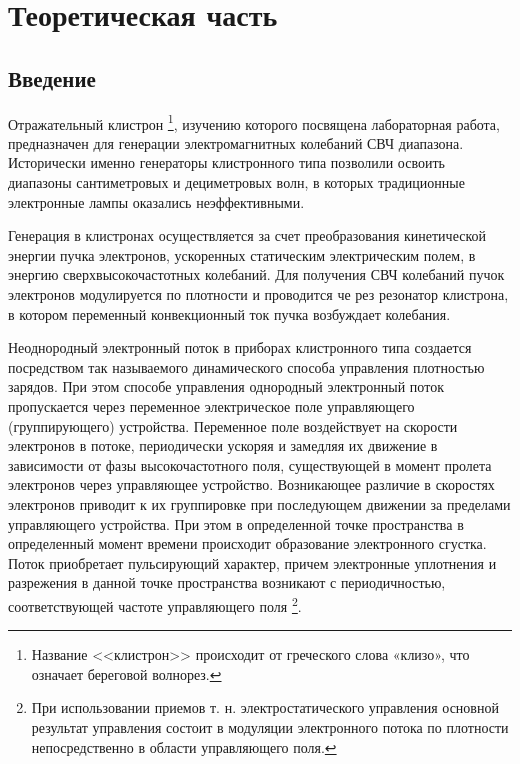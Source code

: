 
	\def\authors{Есюнин М.В., Есюнин Д.В.}
	\def\labname{Исследование отражательного клистрона}
	\def\sciadviser{Павличенко И.А.}
	\def\shortlabname{Исследование отражательного клистрона}
\usepackage{float}
\usepackage{physics}



\renewcommand{\phi}{\varphi}
\renewcommand{\hat}{\widehat}

\tableofcontents

\newpage
\sloppy

\section{Теоретическая часть}
\subsection{Введение}
Отражательный клистрон
\footnote{Название <<клистрон>> происходит от греческого слова «клизо», что означает береговой волнорез.}, 
изучению которого посвящена лабораторная работа, предназначен для генерации электромагнитных колебаний СВЧ диапазона. Исторически именно генераторы клистронного типа позволили освоить диапазоны сантиметровых и дециметровых волн, в которых традицион­ные электронные лампы оказались неэффективными.

Генерация в клистронах осуществляется за счет преобразования кинетической энергии пучка электронов, ускоренных статическим электрическим полем, в энергию сверхвысокочастотных колебаний. Для получения СВЧ колебаний пучок электронов модулируется по плотности и проводится че­ рез резонатор клистрона, в котором переменный конвекционный ток пучка возбуждает колебания.

Неоднородный электронный поток в приборах клистронного типа создается посредством так называемого динамического способа управления плотностью зарядов. При этом способе управления однородный электронный по­ток пропускается через переменное электрическое поле управляющего (группирующего) устройства. Переменное поле воздействует на скорости электро­нов в потоке, периодически ускоряя и замедляя их движение в зависимости от фазы высокочастотного поля, существующей в момент пролета электронов через управляющее устройство. Возникающее различие в скоростях электронов приводит к их группировке при последующем движении за пре­делами управляющего устройства. При этом в определенной точке пространства в определенный момент времени происходит образование электронного сгустка. Поток приобретает пульсирующий характер, причем электронные уплотнения и разрежения в данной точке пространства возникают с периодичностью, соответствующей частоте управляющего поля
\footnote{При использовании приемов т. н. электростатического управления основной результат управления состоит в модуляции электронного потока по плотности непосредственно в области управляющего поля.}.

